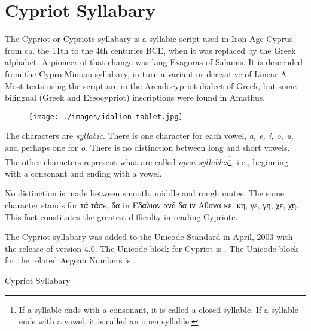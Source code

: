 \section{Cypriot Syllabary}
\label{s:cypriot}
The Cypriot or Cypriote syllabary is a syllabic script used in Iron Age Cyprus, from ca. the 11th to the 4th centuries BCE, when it was replaced by the Greek alphabet. A pioneer of that change was king Evagoras of Salamis. It is descended from the Cypro-Minoan syllabary, in turn a variant or derivative of Linear A. Most texts using the script are in the Arcadocypriot dialect of Greek, but some bilingual (Greek and Eteocypriot) inscriptions were found in Amathus.

\begin{figure}[htb]
\centering
\begin{minipage}{7cm}
\texttt{[image: ./images/idalion-tablet.jpg]}
\end{minipage}\hspace{1.5em}
\begin{minipage}{6cm}
\end{minipage}
\end{figure}


The characters are \textit{syllabic}. There is one character for each  vowel, \textit{a, e, i, o, u,} and perhaps one for \textit{o}. There is no distinction between long and short vowels. The other characters represent what are called \textit{open syllables}\footnote{ If a syllable ends with a consonant, it is called a closed syllable. If a syllable ends with a vowel, it is called an open syllable. }, i.e., beginning with a consonant and ending with a vowel. 

No distinction is made between smooth, middle and rough mutes. The same character stands for τά τ\'ασs, δα in Εδαλιον ανδ δα ιν Αθανα  κε, κη, γε, γη, χε, χη. This fact constitutes the greatest difficulty in reading Cypriote.  

The Cypriot syllabary was added to the Unicode Standard in April, 2003 with the release of version 4.0.
The Unicode block for Cypriot is . The Unicode block for the related Aegean Numbers is .



\begin{scriptexample}[]{Cypriot Syllabary}

\cypriote {}
\end{scriptexample}


